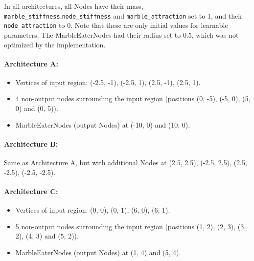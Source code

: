 In all architectures, all Nodes have their mass, \texttt{marble\_stiffness},\texttt{node\_stiffness} and \texttt{marble\_attraction} set to 1, and their \texttt{node\_attraction} to 0. Note that these are only initial values for learnable parameters. The MarbleEaterNodes had their radius set to 0.5, which was not optimized by the implementation.

\paragraph{Architecture A:}
\begin{itemize}
	\item Vertices of input region: (-2.5, -1), (-2.5, 1), (2.5, -1), (2.5, 1).
	\item 4 non-output nodes surrounding the input region (positions (0, -5), (-5, 0), (5, 0) and (0, 5)).
	\item MarbleEaterNodes (output Nodes) at (-10, 0) and (10, 0).
\end{itemize}

\paragraph{Architecture B:}
Same as Architecture A, but with additional Nodes at (2.5, 2.5), (-2.5, 2.5), (2.5, -2.5), (-2.5, -2.5).

\paragraph{Architecture C:}
\begin{itemize}
	\item Vertices of input region: (0, 0), (0, 1), (6, 0), (6, 1).
	\item 5 non-output nodes surrounding the input region (positions (1, 2), (2, 3), (3, 2), (4, 3) and (5, 2)).
	\item MarbleEaterNodes (output Nodes) at (1, 4) and (5, 4).
\end{itemize}

